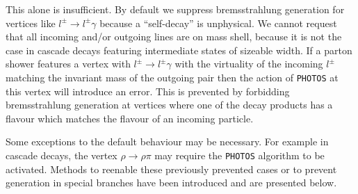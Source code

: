 \documentclass[]{Photos_interface_design}
\begin{document}
This alone is insufficient. By default we suppress bremsstrahlung
generation for vertices like $l^\pm \to l^\pm \gamma$ because a
``self-decay'' is unphysical. We cannot request that all incoming
and/or outgoing lines are on mass shell, because it is not the case in
cascade decays featuring intermediate states of sizeable width. If a
parton shower features a vertex with $l^\pm \to l^\pm \gamma$ with the
virtuality of the incoming $l^\pm$ matching the invariant mass of the
outgoing pair then the action of {\tt PHOTOS} at this vertex will
introduce an error.  This is prevented by forbidding bremsstrahlung
generation at vertices where one of the decay products has a flavour
which matches the flavour of an incoming particle.


Some exceptions to the default behaviour may be necessary. For example
in cascade decays, the vertex $\rho \to \rho \pi$ may require the
{\tt PHOTOS} algorithm to be activated.
Methods to reenable these previously prevented cases or to prevent generation in special
branches have been introduced and are presented below. \\ \\ 
\end{document}
